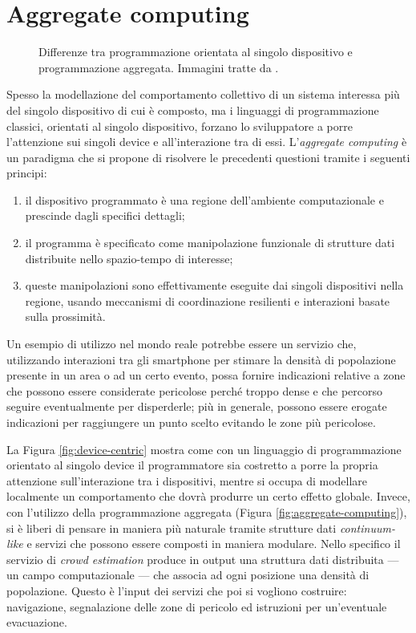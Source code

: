 \section{Aggregate computing}
\label{sec:aggregate-computing}
\begin{figure}
  \hfill
  \caption{Differenze tra programmazione orientata al singolo dispositivo e
    programmazione aggregata. Immagini tratte da \cite{Protelis}.}
\end{figure}
Spesso la modellazione del comportamento collettivo di un sistema interessa più
del singolo dispositivo di cui è composto, ma i linguaggi di programmazione
classici, orientati al singolo dispositivo, forzano lo sviluppatore a porre
l'attenzione sui singoli device e all'interazione tra di
essi. L'\textit{aggregate computing} è un paradigma che si propone di risolvere
le precedenti questioni tramite i seguenti
principi\cite{DBLP:journals/computer/BealPV15}:
\begin{enumerate}
\item il dispositivo programmato è una regione dell'ambiente computazionale e
  prescinde dagli specifici dettagli;
\item il programma è specificato come manipolazione funzionale di strutture dati
  distribuite nello spazio-tempo di interesse;
\item queste manipolazioni sono effettivamente eseguite dai singoli dispositivi
  nella regione, usando meccanismi di coordinazione resilienti e interazioni
  basate sulla prossimità.
\end{enumerate}

Un esempio di utilizzo nel mondo reale potrebbe essere un servizio che,
utilizzando interazioni tra gli smartphone per stimare la densità di popolazione
presente in un area o ad un certo evento, possa fornire indicazioni relative a
zone che possono essere considerate pericolose perché troppo dense e che percorso
seguire eventualmente per disperderle; più in generale, possono essere erogate
indicazioni per raggiungere un punto scelto evitando le zone più pericolose.

La Figura \ref{fig:device-centric} mostra come con un linguaggio di
programmazione orientato al singolo device il programmatore sia costretto a
porre la propria attenzione sull'interazione tra i dispositivi, mentre si occupa
di modellare localmente un comportamento che dovrà produrre un certo effetto
globale.  Invece, con l'utilizzo della programmazione aggregata (Figura
\ref{fig:aggregate-computing}), si è liberi di pensare in maniera più naturale
tramite strutture dati \textit{continuum-like} e servizi che possono essere
composti in maniera modulare.  Nello specifico il servizio di \textit{crowd
  estimation} produce in output una struttura dati distribuita --- un campo
computazionale --- che associa ad ogni posizione una densità di
popolazione. Questo è l'input dei servizi che poi si vogliono costruire:
navigazione, segnalazione delle zone di pericolo ed istruzioni per un'eventuale
evacuazione.

